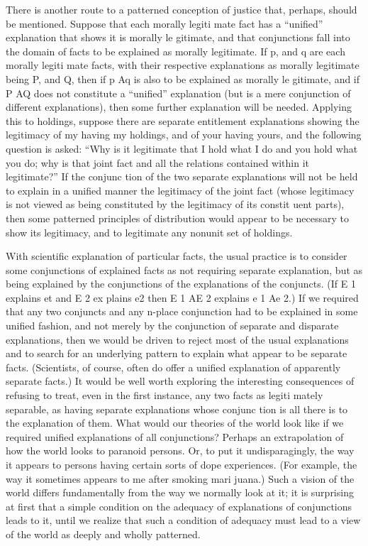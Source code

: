 \documentclass[11pt,openany]{book}
\begin{document}
There is another route to a patterned conception of justice that, perhaps, should be mentioned. Suppose that each morally legiti mate fact has a ``unified'' explanation that shows it is morally le gitimate, and that conjunctions fall into the domain of facts to be explained as morally legitimate. If p, and q are each morally legiti mate facts, with their respective explanations as morally legitimate being P, and Q, then if p Aq is also to be explained as morally le gitimate, and if P AQ does not constitute a ``unified'' explanation (but is a mere conjunction of different explanations), then some further explanation will be needed. Applying this to holdings, suppose there are separate entitlement explanations showing the legitimacy of my having my holdings, and of your having yours, and the following question is asked: ``Why is it legitimate that I hold what I do and you hold what you do; why is that joint fact and all the relations contained within it legitimate?'' If the conjunc tion of the two separate explanations will not be held to explain in a unified manner the legitimacy of the joint fact (whose legitimacy is not viewed as being constituted by the legitimacy of its constit uent parts), then some patterned principles of distribution would appear to be necessary to show its legitimacy, and to legitimate any nonunit set of holdings. 

With scientific explanation of particular facts, the usual practice is to consider some conjunctions of explained facts as not requiring separate explanation, but as being explained by the conjunctions of the explanations of the conjuncts. (If E 1 explains et and E 2 ex plains e2 then E 1 AE 2 explains e 1 Ae 2.) If we required that any two conjuncts and any n-place conjunction had to be explained in some unified fashion, and not merely by the conjunction of separate and disparate explanations, then we would be driven to reject most of the usual explanations and to search for an underlying pattern to explain what appear to be separate facts. (Scientists, of course, often do offer a unified explanation of apparently separate facts.) It would be well worth exploring the interesting consequences of refusing to treat, even in the first instance, any two facts as legiti mately separable, as having separate explanations whose conjunc tion is all there is to the explanation of them. What would our theories of the world look like if we required unified explanations of all conjunctions? Perhaps an extrapolation of how the world looks to paranoid persons. Or, to put it undisparagingly, the way it appears to persons having certain sorts of dope experiences. (For example, the way it sometimes appears to me after smoking mari juana.) Such a vision of the world differs fundamentally from the way we normally look at it; it is surprising at first that a simple condition on the adequacy of explanations of conjunctions leads to it, until we realize that such a condition of adequacy must lead to a view of the world as deeply and wholly patterned. 
\end{document}

